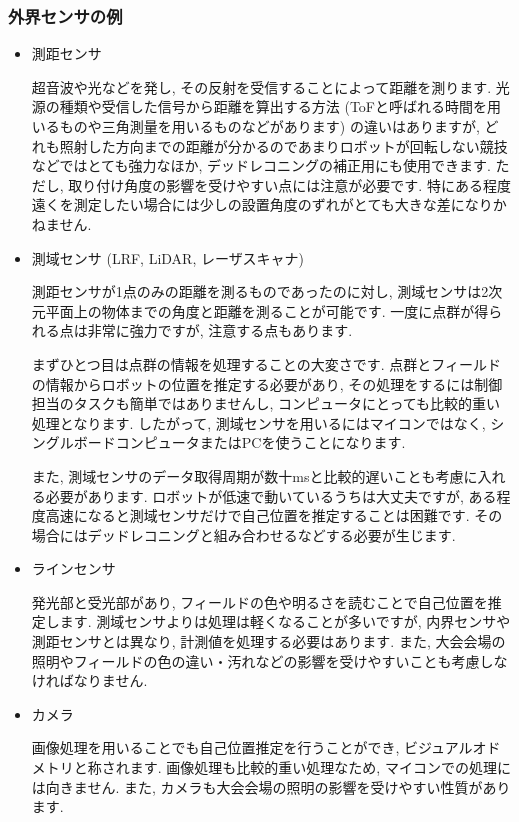 \subsubsection{外界センサの例}
\begin{itemize}
    \item 測距センサ
    \par
    超音波や光などを発し, その反射を受信することによって距離を測ります. 
    光源の種類や受信した信号から距離を算出する方法 (ToFと呼ばれる時間を用いるものや三角測量を用いるものなどがあります) の違いはありますが, どれも照射した方向までの距離が分かるのであまりロボットが回転しない競技などではとても強力なほか, デッドレコニングの補正用にも使用できます. 
    ただし, 取り付け角度の影響を受けやすい点には注意が必要です. 特にある程度遠くを測定したい場合には少しの設置角度のずれがとても大きな差になりかねません. 
    \item 測域センサ (LRF, LiDAR, レーザスキャナ)
    \par
    測距センサが1点のみの距離を測るものであったのに対し, 測域センサは2次元平面上の物体までの角度と距離を測ることが可能です. 
    一度に点群が得られる点は非常に強力ですが, 注意する点もあります. 
    \par
    まずひとつ目は点群の情報を処理することの大変さです. 点群とフィールドの情報からロボットの位置を推定する必要があり, その処理をするには制御担当のタスクも簡単ではありませんし, コンピュータにとっても比較的重い処理となります. 
    したがって, 測域センサを用いるにはマイコンではなく, シングルボードコンピュータまたはPCを使うことになります. 
    \par
    また, 測域センサのデータ取得周期が数十\si{\milli\second}と比較的遅いことも考慮に入れる必要があります. 
    ロボットが低速で動いているうちは大丈夫ですが, ある程度高速になると測域センサだけで自己位置を推定することは困難です. 
    その場合にはデッドレコニングと組み合わせるなどする必要が生じます. 
    
    \item ラインセンサ
    \par
    発光部と受光部があり, フィールドの色や明るさを読むことで自己位置を推定します. 
    測域センサよりは処理は軽くなることが多いですが, 内界センサや測距センサとは異なり, 計測値を処理する必要はあります. 
    また, 大会会場の照明やフィールドの色の違い・汚れなどの影響を受けやすいことも考慮しなければなりません. 
    \item カメラ
    \par
    画像処理を用いることでも自己位置推定を行うことができ, ビジュアルオドメトリと称されます. 
    画像処理も比較的重い処理なため, マイコンでの処理には向きません. 
    また, カメラも大会会場の照明の影響を受けやすい性質があります. 
\end{itemize}
